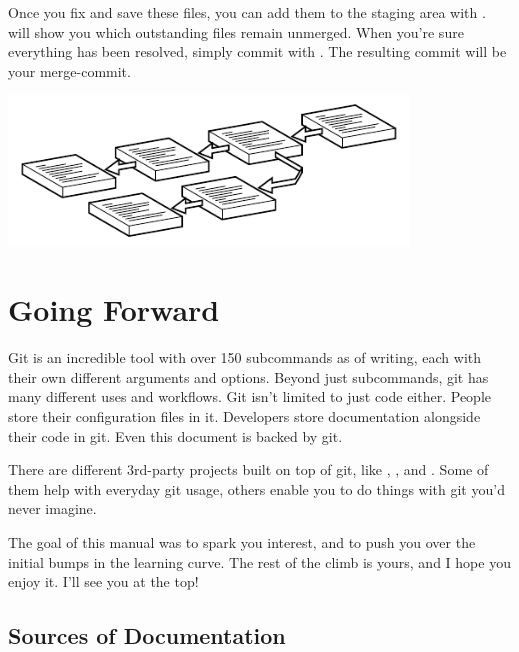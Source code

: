 \documentclass[11pt,letterpaper,twoside]{report}
\begin{document}
Once you fix and save these files, you can add them to the staging area with
.  will show you which outstanding files remain
unmerged. When you're sure everything has been resolved, simply commit with
. The resulting commit will be your merge-commit.

\vspace{\fill}
\begin{center}
\includegraphics[height=4cm]{resources/branching_abstract.pdf}
\end{center}
\vspace*{\fill}


\chapter{Going Forward}

Git is an incredible tool with over 150 subcommands as of writing, each with
their own different arguments and options. Beyond just subcommands, git has many
different uses and workflows. Git isn't limited to just code either. People
store their configuration files in it. Developers store documentation alongside
their code in git. Even this document is backed by git.

There are different 3rd-party projects built on top of git, like
, , and . Some of them help
with everyday git usage, others enable you to do things with git you'd never
imagine.

The goal of this manual was to spark you interest, and to push you over the
initial bumps in the learning curve. The rest of the climb is yours, and I hope
you enjoy it. I'll see you at the top!

\section{Sources of Documentation}
\end{document}
